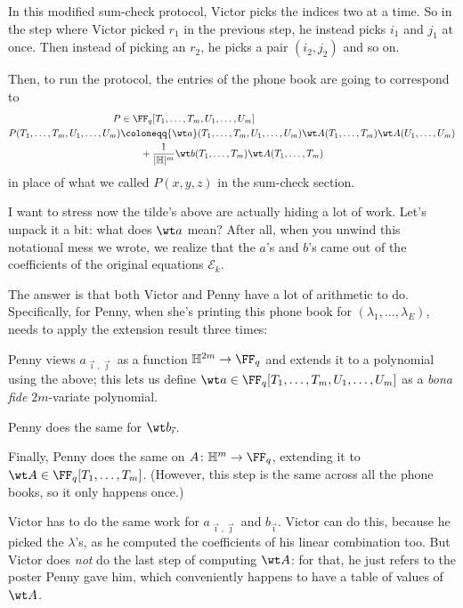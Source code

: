 \documentclass[11pt]{scrreprt}
\newcommand{\HH}{\mathbb H}
\begin{document}
In this modified sum-check protocol, Victor picks the indices two at a time.
So in the step where Victor picked $r_1$ in the previous step,
he instead picks $i_1$ and $j_1$ at once.
Then instead of picking an $r_2$, he picks a pair $(i_2, j_2)$ and so on.

Then, to run the protocol, the entries of the phone book are going to correspond to
\begin{align*}
  P &\in \FF_q[T_1, \dots, T_m, U_1, \dots, U_m] \\
  P(T_1, \dots, T_m, U_1, \dots, U_m) &\coloneqq
    {\wt a}(T_1, \dots, T_m, U_1, \dots, U_m) \wt A(T_1, \dots, T_m) \wt A(U_1, \dots,
    U_m) \\
    &\qquad + \frac{1}{|\HH|^m} {\wt b}(T_1, \dots, T_m) \wt A(T_1, \dots, T_m)
\end{align*}
in place of what we called $P(x,y,z)$ in the sum-check section.

I want to stress now the tilde's above are actually hiding a lot of work.
Let's unpack it a bit: what does $\wt a$ mean?
After all, when you unwind this notational mess we wrote,
we realize that the $a$'s and $b$'s came out of the coefficients of the original
equations $\mathcal E_k$.

The answer is that both Victor and Penny have a lot of arithmetic to do.
Specifically, for Penny,
when she's printing this phone book for $(\lambda_1, \dots, \lambda_E)$,
needs to apply the extension result three times:
\begin{itemize}
  \ii Penny views $a_{\vec\imath, \vec\jmath}$ as a function $\HH^{2m} \to \FF_q$
  and extends it to a polynomial using the above;
  this lets us define
  $\wt a \in \FF_q[T_1, \dots, T_m, U_1, \dots, U_m]$
  as a \emph{bona fide} $2m$-variate polynomial.

  \ii Penny does the same for $\wt b_{\vec\imath}$.

  \ii Finally, Penny does the same on $A \colon \HH^m \to \FF_q$,
  extending it to $\wt A \in \FF_q[T_1, \dots, T_m]$.
  (However, this step is the same across all the phone books, so it only happens once.)
\end{itemize}
Victor has to do the same work for $a_{\vec\imath, \vec\jmath}$ and $b_{\vec\imath}$.
Victor can do this, because he picked the $\lambda$'s,
as he computed the coefficients of his linear combination too.
But Victor does \emph{not} do the last step of computing $\wt A$:
for that, he just refers to the poster Penny gave him,
which conveniently happens to have a table of values of $\wt A$.
\end{document}
